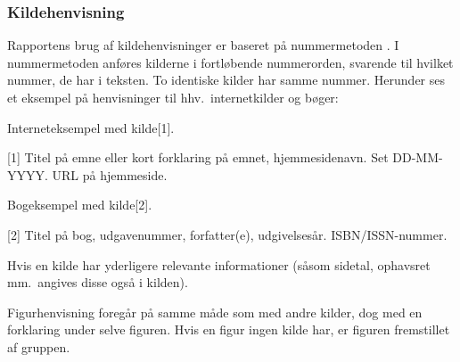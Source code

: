 \subsubsection{Kildehenvisning}
Rapportens brug af kildehenvisninger er baseret på nummermetoden \cite{nummermetoden}. I nummermetoden anføres kilderne i fortløbende nummerorden, svarende til hvilket nummer, de har i teksten. To identiske kilder har samme nummer. Herunder ses et eksempel på henvisninger til hhv.\ internetkilder og bøger:

Interneteksempel med kilde[1].

[1] Titel på emne eller kort forklaring på emnet, hjemmesidenavn. Set DD-MM-YYYY. URL på hjemmeside.


Bogeksempel med kilde[2].

[2] Titel på bog, udgavenummer, forfatter(e), udgivelsesår. ISBN/ISSN-nummer.


Hvis en kilde har yderligere relevante informationer (såsom sidetal, ophavsret mm.\ angives disse også i kilden).


Figurhenvisning foregår på samme måde som med andre kilder, dog med en forklaring under selve figuren. Hvis en figur ingen kilde har, er figuren fremstillet af gruppen.
